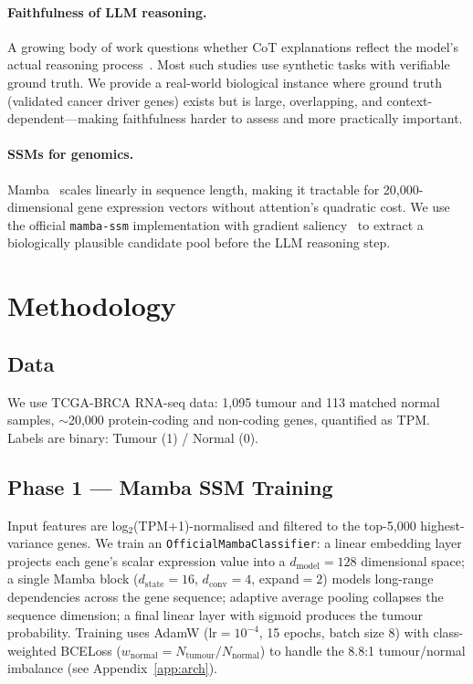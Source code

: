 \documentclass{article}
\begin{document}
\paragraph{Faithfulness of LLM reasoning.}
A growing body of work questions whether CoT explanations reflect the
model's actual reasoning process~\citep{turpin2023unfaithful,lanham2023measuring}.
Most such studies use synthetic tasks with verifiable ground truth.
We provide a real-world biological instance where ground truth
(validated cancer driver genes) exists but is large, overlapping, and
context-dependent---making faithfulness harder to assess and more
practically important.

\paragraph{SSMs for genomics.}
Mamba~\citep{gu2024mamba} scales linearly in sequence length, making it
tractable for 20,000-dimensional gene expression vectors without
attention's quadratic cost.
We use the official \texttt{mamba-ssm} implementation with gradient
saliency~\citep{simonyan2014deep} to extract a biologically plausible
candidate pool before the LLM reasoning step.

\section{Methodology}
\label{sec:method}

\subsection{Data}
We use TCGA-BRCA RNA-seq data: 1,095 tumour and 113 matched normal samples,
$\sim$20,000 protein-coding and non-coding genes, quantified as TPM.
Labels are binary: Tumour (1) / Normal (0).

\subsection{Phase 1 — Mamba SSM Training}
Input features are log$_2$(TPM$+$1)-normalised and filtered to the top-5,000
highest-variance genes.
We train an \texttt{OfficialMambaClassifier}: a linear embedding layer
projects each gene's scalar expression value into a $d_\text{model}=128$
dimensional space; a single Mamba block ($d_\text{state}=16$,
$d_\text{conv}=4$, expand$=2$) models long-range dependencies across
the gene sequence; adaptive average pooling collapses the sequence
dimension; a final linear layer with sigmoid produces the tumour
probability.
Training uses AdamW ($\text{lr}=10^{-4}$, 15 epochs, batch size 8)
with class-weighted BCELoss
($w_\text{normal} = N_\text{tumour}/N_\text{normal}$)
to handle the 8.8:1 tumour/normal imbalance (see Appendix~\ref{app:arch}).
\end{document}
